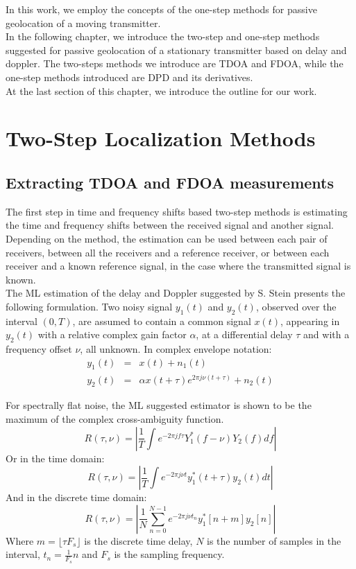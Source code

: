 \documentclass[10pt,a4paper]{report}
\begin{document}
In this work, we employ the concepts of the one-step methods for passive geolocation of a moving transmitter. \\

In the following chapter, we introduce the two-step and one-step methods suggested for passive geolocation of a stationary transmitter based on delay and doppler.
The two-steps methods we introduce are TDOA and FDOA, while the one-step methods introduced are DPD and its derivatives.\\
At the last section of this chapter, we introduce the outline for our work.

\section{Two-Step Localization Methods}
\subsection{Extracting TDOA and FDOA measurements}
The first step in time and frequency shifts based two-step methods is estimating the time and frequency shifts between the received signal and another signal. Depending on the method, the estimation can be used between each pair of receivers, between all the receivers and a reference receiver, or between each receiver and a known reference signal, in the case where the transmitted signal is known.\\

The ML estimation of the delay and Doppler suggested by S. Stein \cite{stein} presents the following formulation.
Two noisy signal $y_1(t)$ and $y_2(t)$, observed over the interval $(0,T)$, are assumed to contain a common signal $x(t)$, appearing in $y_2(t)$ with a relative complex gain factor $\alpha$, at a differential delay $\tau$ and with a frequency offset $\nu$, all unknown. In complex envelope notation:
\begin{eqnarray}
y_1(t) &=& x(t)+n_1(t)\\
y_2(t) &=& \alpha x(t+\tau)e^{2 \pi j \nu (t+\tau)} + n_2(t) \nonumber
\end{eqnarray}

For spectrally flat noise, the ML suggested estimator is shown to be the maximum of the complex cross-ambiguity function.
\begin{equation}
R(\tau,\nu) = \left|\frac{1}{T}\int e^{-2 \pi j f \tau} Y_1^*(f-\nu)Y_2(f)df\right|
\end{equation}
Or in the time domain:
\begin{equation}
R(\tau,\nu) = \left|\frac{1}{T}\int e^{-2 \pi j \nu t} y_1^*(t+\tau)y_2(t)dt\right|
\end{equation}
And in the discrete time domain:
\begin{equation}
R(\tau,\nu) = \left|\frac{1}{N} \sum_{n=0}^{N-1} e^{-2 \pi j \nu t_n} y_1^*[n+m]y_2[n]\right|
\end{equation}
Where $m=\lfloor \tau F_s \rfloor$ is the discrete time delay, $N$ is the number of samples in the interval, $t_n = \frac{1}{F_s}n$ and $F_s$ is the sampling frequency.
\end{document}
